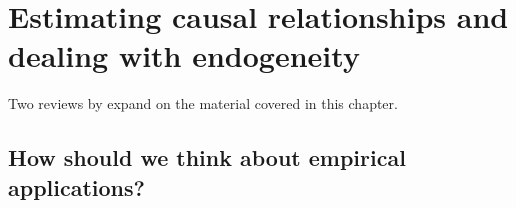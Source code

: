 

\chapter{Estimating causal relationships and dealing with endogeneity}
\label{ch_causality}
Two reviews by \citet{IW07,IW09} expand on the material covered in
this chapter.
\section{How should we think about empirical applications?}


